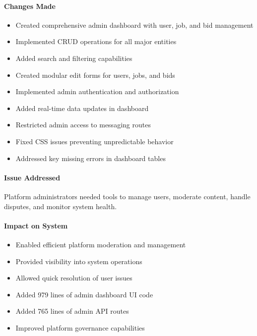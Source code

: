 \documentclass[11pt]{article}
\begin{document}
\paragraph{Changes Made}
\begin{itemize}[leftmargin=1.4em]
  \item Created comprehensive admin dashboard with user, job, and bid management
  \item Implemented CRUD operations for all major entities
  \item Added search and filtering capabilities
  \item Created modular edit forms for users, jobs, and bids
  \item Implemented admin authentication and authorization
  \item Added real-time data updates in dashboard
  \item Restricted admin access to messaging routes
  \item Fixed CSS issues preventing unpredictable behavior
  \item Addressed key missing errors in dashboard tables
\end{itemize}

\paragraph{Issue Addressed}
Platform administrators needed tools to manage users, moderate content, handle disputes, and monitor system health.

\paragraph{Impact on System}
\begin{itemize}[leftmargin=1.4em]
  \item Enabled efficient platform moderation and management
  \item Provided visibility into system operations
  \item Allowed quick resolution of user issues
  \item Added 979 lines of admin dashboard UI code
  \item Added 765 lines of admin API routes
  \item Improved platform governance capabilities
\end{itemize}
\end{document}

